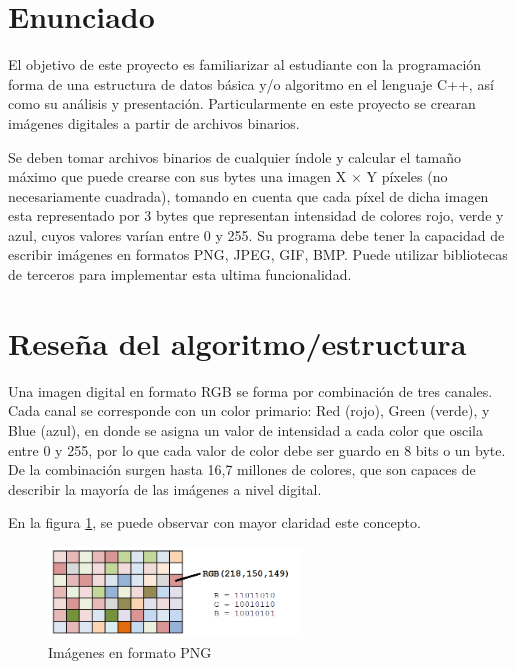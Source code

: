 \section{Enunciado}
El objetivo de este proyecto es familiarizar al estudiante con la programación forma de una estructura de datos básica y/o algoritmo en el lenguaje C++, así como su análisis y presentación. Particularmente en este proyecto se crearan imágenes digitales a partir de archivos binarios.

Se deben tomar archivos binarios de cualquier  índole y calcular el tamaño máximo que puede crearse con sus bytes una imagen X × Y píxeles (no necesariamente cuadrada), tomando en cuenta que cada píxel de dicha imagen esta representado por 3 bytes que representan intensidad de colores rojo, verde y azul, cuyos valores varían entre 0 y 255. Su programa debe tener la capacidad de escribir imágenes en formatos PNG, JPEG, GIF, BMP. Puede utilizar bibliotecas de terceros para implementar esta ultima funcionalidad.
\section{Reseña del algoritmo/estructura}

Una imagen digital en formato RGB se forma por combinación de tres canales. Cada canal se corresponde con un color primario: Red (rojo), Green (verde), y Blue (azul), en donde se asigna un valor de intensidad a cada color que oscila entre 0 y 255, por lo que cada valor de color debe ser guardo en 8 bits o un byte. De la combinación surgen hasta 16,7 millones de colores, que son capaces de describir la mayoría de las imágenes a nivel digital.

En la figura \ref{fig:matrizRGB}, se puede observar con mayor claridad este concepto.

\begin{figure}[H]
\centering
\includegraphics[width=0.6\textwidth]{imgs/proyecto0/matrix.png}
\caption{Imágenes en formato PNG}
\label{fig:matrizRGB}
\end{figure}

